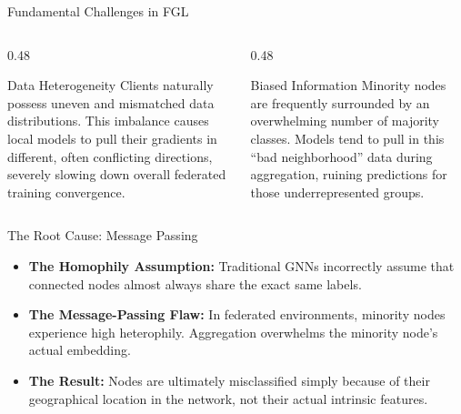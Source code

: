 \documentclass[11pt, aspectratio=169]{beamer}
\begin{document}
\begin{frame}{Fundamental Challenges in FGL}
    \begin{columns}[T]
        \begin{column}{0.48\textwidth}
            \begin{block}{Data Heterogeneity}
                Clients naturally possess uneven and mismatched data distributions. This imbalance causes local models to pull their gradients in different, often conflicting directions, severely slowing down overall federated training convergence.
            \end{block}
        \end{column}
        
        \begin{column}{0.48\textwidth}
            \begin{block}{Biased Information}
                Minority nodes are frequently surrounded by an overwhelming number of majority classes. Models tend to pull in this ``bad neighborhood'' data during aggregation, ruining predictions for those underrepresented groups.
            \end{block}
        \end{column}
    \end{columns}
\end{frame}

\begin{frame}{The Root Cause: Message Passing}
    \begin{itemize}
        \item \textbf{The Homophily Assumption:} Traditional GNNs incorrectly assume that connected nodes almost always share the exact same labels.
        \vspace{0.4cm}
        \item \textbf{The Message-Passing Flaw:} In federated environments, minority nodes experience high heterophily. Aggregation overwhelms the minority node's actual embedding.
        \vspace{0.4cm}
        \item \textbf{The Result:} Nodes are ultimately misclassified simply because of their geographical location in the network, not their actual intrinsic features.
    \end{itemize}
\end{frame}
\end{document}
